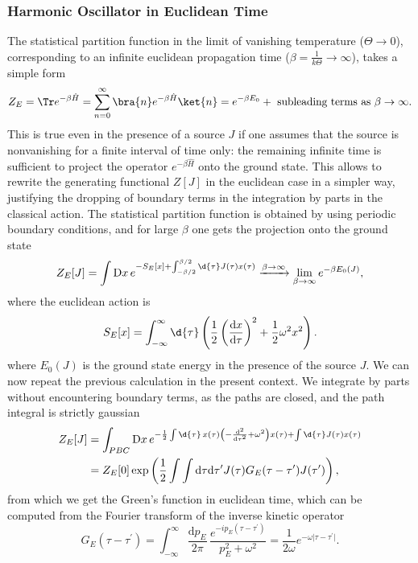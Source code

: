\subsubsection{Harmonic Oscillator in Euclidean Time}

The statistical partition function in the limit of vanishing temperature (\(\Theta \to  0\)), corresponding to an infinite euclidean propagation time (\(\beta = \frac{1}{k \Theta} \to  \infty\)), takes a simple form
\[
    Z_E = \Tr e^{-\beta \hat{H}} = \sum_{n=0}^{\infty} \bra{n} e^{-\beta \hat{H}} \ket{n} = e^{-\beta E_0} + \text{ subleading terms as } \beta \to \infty.
\]
This is true even in the presence of a source \(J\) if one assumes that the source is nonvanishing for a finite interval of time only: the remaining infinite time is sufficient to project the operator \(e^{-\beta \hat{H}}\) onto the ground state. This allows to rewrite the generating functional \(Z[J]\) in the euclidean case in a simpler way, justifying the dropping of boundary terms in the integration by parts in the classical action. The statistical partition function is obtained by using periodic boundary conditions, and for large \(\beta\) one gets the projection onto the ground state
\[
    Z_E[J] = \int \mathrm{D} x \, e^{-S_E[x] + \int_{-\beta/2}^{\beta/2} \d{\tau} J(\tau) x(\tau)} \xrightarrow{\beta \to  \infty} \lim_{\beta \to \infty} e^{- \beta E_0(J)},
\]
where the euclidean action is
\[
    S_E[x] = \int_{-\infty}^{\infty} \d{\tau} \left( \frac{1}{2} \left(\frac{\mathrm{d} x}{\mathrm{d} \tau}\right)^2 + \frac{1}{2} \omega^2 x^2 \right).
\]
where \(E_0(J)\) is the ground state energy in the presence of the source \(J\). We can now repeat the previous calculation in the present context. We integrate by parts without encountering boundary terms, as the paths are closed, and the path integral is strictly gaussian
\[
    \begin{aligned}
        Z_E[J] & = \int_{PBC} \mathrm{D} x \, e^{-\frac{1}{2} \int \d{\tau} \, x(\tau) \left( -\frac{\mathrm{d}^2}{\mathrm{d} \tau^2} + \omega^2 \right) x(\tau) + \int \d{\tau} J(\tau) x(\tau)} \\
               & = Z_E[0] \exp\left( \frac{1}{2} \int\int \mathrm{d}\tau \mathrm{d}\tau^{\prime} J(\tau) G_E(\tau - \tau^{\prime}) J(\tau^{\prime}) \right),
    \end{aligned}
\]
from which we get the Green's function in euclidean time, which can be computed from the Fourier transform of the inverse kinetic operator
\begin{equation}
    G_E(\tau - \tau^{\prime}) = \int_{-\infty}^{\infty} \frac{\mathrm{d}p_E}{2\pi} \, \frac{e^{-ip_E(\tau - \tau^{\prime})}}{p_E^2 + \omega^2} = \frac{1}{2\omega} e^{-\omega \vert \tau - \tau^{\prime} \vert}.
    \label{eq:euclidean_green_function_harmonic_oscillator}
\end{equation}

